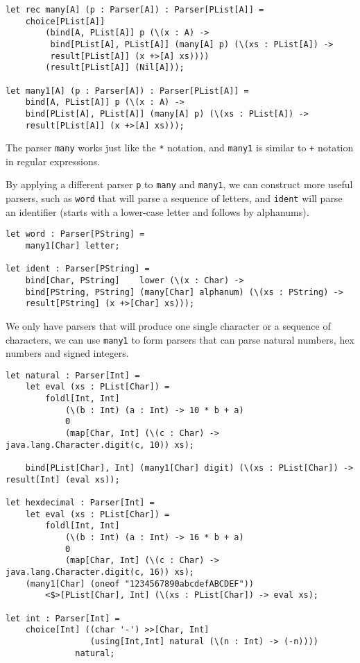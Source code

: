 \begin{lstlisting}
let rec many[A] (p : Parser[A]) : Parser[PList[A]] =
    choice[PList[A]]
        (bind[A, PList[A]] p (\(x : A) ->
         bind[PList[A], PList[A]] (many[A] p) (\(xs : PList[A]) ->
         result[PList[A]] (x +>[A] xs))))
        (result[PList[A]] (Nil[A]));

let many1[A] (p : Parser[A]) : Parser[PList[A]] =
    bind[A, PList[A]] p (\(x : A) ->
    bind[PList[A], PList[A]] (many[A] p) (\(xs : PList[A]) ->
    result[PList[A]] (x +>[A] xs)));
\end{lstlisting}

The parser \texttt{many} works just like the \texttt{*} notation, and \texttt{many1} is similar to \texttt{+} notation in regular expressions.

By applying a different parser \texttt{p} to \texttt{many} and \texttt{many1}, we can construct more useful parsers, such as \texttt{word} that will parse a sequence of letters, and \texttt{ident} will parse an identifier (starts with a lower-case letter and follows by alphanums).

\begin{lstlisting}
let word : Parser[PString] =
    many1[Char] letter;

let ident : Parser[PString] =
    bind[Char, PString]    lower (\(x : Char) ->
    bind[PString, PString] (many[Char] alphanum) (\(xs : PString) ->
    result[PString] (x +>[Char] xs)));
\end{lstlisting}

We only have parsers that will produce one single character or a sequence of characters, we can use \texttt{many1} to form parsers that can parse natural numbers, hex numbers and signed integers.

\begin{lstlisting}
let natural : Parser[Int] =
    let eval (xs : PList[Char]) =
        foldl[Int, Int]
            (\(b : Int) (a : Int) -> 10 * b + a)
            0
            (map[Char, Int] (\(c : Char) -> java.lang.Character.digit(c, 10)) xs);

    bind[PList[Char], Int] (many1[Char] digit) (\(xs : PList[Char]) -> result[Int] (eval xs));

let hexdecimal : Parser[Int] =
    let eval (xs : PList[Char]) =
        foldl[Int, Int]
            (\(b : Int) (a : Int) -> 16 * b + a)
            0
            (map[Char, Int] (\(c : Char) -> java.lang.Character.digit(c, 16)) xs);
    (many1[Char] (oneof "1234567890abcdefABCDEF"))
        <$>[PList[Char], Int] (\(xs : PList[Char]) -> eval xs);

let int : Parser[Int] =
    choice[Int] ((char '-') >>[Char, Int]
                 (using[Int,Int] natural (\(n : Int) -> (-n))))
              natural;
\end{lstlisting}

